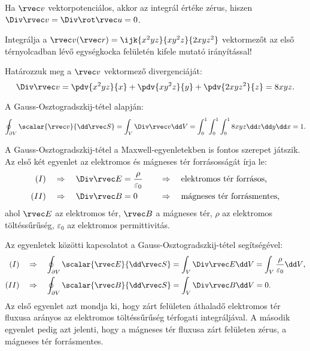 \documentclass[a4paper, 12pt]{scrartcl}
\newcommand\coordv{\rvec r}
\begin{document}
\begin{note}
  Ha $\rvec v$ vektorpotenciálos, akkor az integrál értéke zérus, hiszen
  $\Div \rvec v = \Div \rot \rvec u = 0$.
\end{note}

\begin{example}
  Integrálja a $\rvec v(\coordv) = \ijk{x^2 y z}{x y^2 z}{2 x y z^2}$
  vektormezőt az első térnyolcadban lévő egységkocka felületén kifele mutató
  irányítással!

  Határozzuk meg a $\rvec v$ vektormező divergenciáját:
  $$
    \Div \rvec v
    = \pdv{x^2 y z}{x} + \pdv{x y^2 z}{y} + \pdv{2 x y z^2}{z}
    = 8 x y z
    \text.
  $$

  A Gauss-Osztogradszkij-tétel alapján:
  $$
    \oint_{\partial V} \scalar{\rvec v}{\dd \rvec S}
    = \int_V \Div \rvec v \dd V
    = \int_0^1 \int_0^1 \int_0^1 8 x y z \dd z \dd y \dd x
    = 1
    \text.
  $$
\end{example}

\begin{learnMore}
  A Gauss-Osztogradszkij-tétel a Maxwell-egyenletekben is fontos szerepet
  játszik. Az első két egyenlet az elektromos és mágneses tér forrásosságát
  írja le:
  $$
    \begin{aligned}
      (I)  & \quad \Rightarrow \quad \Div \rvec E = \frac{\rho}{\varepsilon_0}
           &
           & \quad \Rightarrow \quad \text{elektromos tér forrásos,}
      \\
      (II) & \quad \Rightarrow \quad \Div \rvec B = 0
           &
           & \quad \Rightarrow \quad \text{mágneses tér forrásmentes,}
    \end{aligned}
  $$
  ahol $\rvec E$ az elektromos tér, $\rvec B$ a mágneses tér,
  $\rho$ az elektromos töltéssűrűség, $\varepsilon_0$ az elektromos
  permittivitás.

  Az egyenletek közötti kapcsolatot a Gauss-Osztogradszkij-tétel segítségével:
  $$
    \begin{aligned}
      (I)  & \quad \Rightarrow \quad
      \oint_{\partial V} \scalar{\rvec E}{\dd \rvec S}
      = \int_V \Div \rvec E \dd V
      = \int_V \frac{\rho}{\varepsilon_0} \dd V
      \text,
      \\
      (II) & \quad \Rightarrow \quad
      \oint_{\partial V} \scalar{\rvec B}{\dd \rvec S}
      = \int_V \Div \rvec B \dd V
      = 0
      \text.
    \end{aligned}
  $$
  Az első egyenlet azt mondja ki, hogy zárt felületen áthaladő elektromos
  tér fluxusa arányos az elektromos töltéssűrűség térfogati integráljával.
  A második egyenlet pedig azt jelenti, hogy a mágneses tér fluxusa zárt
  felületen zérus, a mágneses tér forrásmentes.
\end{learnMore}
\end{document}
